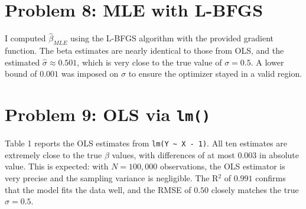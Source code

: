 \documentclass{article}
\begin{document}
\section*{Problem 8: MLE with L-BFGS}

I computed $\hat{\beta}_{MLE}$ using the L-BFGS algorithm with the provided gradient function. The beta estimates are nearly identical to those from OLS, and the estimated $\hat{\sigma} \approx 0.501$, which is very close to the true value of $\sigma = 0.5$. A lower bound of $0.001$ was imposed on $\sigma$ to ensure the optimizer stayed in a valid region.

\section*{Problem 9: OLS via \texttt{lm()}}

Table 1 reports the OLS estimates from \texttt{lm(Y \textasciitilde\ X - 1)}. All ten estimates are extremely close to the true $\beta$ values, with differences of at most $0.003$ in absolute value. This is expected: with $N = 100{,}000$ observations, the OLS estimator is very precise and the sampling variance is negligible. The R$^2$ of $0.991$ confirms that the model fits the data well, and the RMSE of $0.50$ closely matches the true $\sigma = 0.5$.



\end{document}
